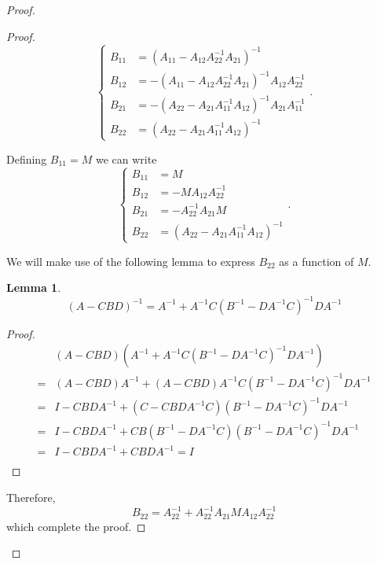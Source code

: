 \documentclass{article}
\newtheorem{lem}[thm]{Lemma}
\theoremstyle{definition}
\theoremstyle{remark}
\begin{document}
\begin{proof}
\begin{proof}
\begin{equation}
\left\{ \begin{array}{rl}
	B_{11}&=\left( A_{11}-A_{12}A_{22}^{-1}A_{21} \right)^{-1}\\ 
	B_{12}&=-\left( A_{11}-A_{12}A_{22}^{-1}A_{21} \right)^{-1}A_{12}A_{22}^{-1}\\
	B_{21}&=-\left( A_{22}-A_{21}A_{11}^{-1}A_{12} \right)^{-1}A_{21}A_{11}^{-1}\\
	B_{22}&=\left( A_{22}-A_{21}A_{11}^{-1}A_{12} \right)^{-1}
\end{array} \right. .
\end{equation}

Defining $B_{11}=M$ we can write
\begin{equation*}
\left\{ \begin{array}{rl}
	B_{11}&=M\\ 
	B_{12}&=-MA_{12}A_{22}^{-1}\\ 
	B_{21}&=-A_{22}^{-1}A_{21}M\\
	B_{22}&=\left( A_{22}-A_{21}A_{11}^{-1}A_{12} \right)^{-1}
\end{array} \right. .
\end{equation*}

We will make use of the following lemma to express $B_{22}$ as a function of $M$.
\begin{lem}
\begin{equation}
(A-CBD)^{-1}=A^{-1}+A^{-1}C(B^{-1}-DA^{-1}C)^{-1}DA^{-1}
\end{equation}
\end{lem}
\begin{proof}
\begin{align*}
&(A-CBD)(A^{-1}+A^{-1}C(B^{-1}-DA^{-1}C)^{-1}DA^{-1})\\
=&(A-CBD)A^{-1}+(A-CBD)A^{-1}C(B^{-1}-DA^{-1}C)^{-1}DA^{-1}\\
=&I-CBDA^{-1}+(C-CBDA^{-1}C)(B^{-1}-DA^{-1}C)^{-1}DA^{-1}\\
=&I-CBDA^{-1}+CB(B^{-1}-DA^{-1}C)(B^{-1}-DA^{-1}C)^{-1}DA^{-1}\\
=&I-CBDA^{-1}+CBDA^{-1}=I\\
\end{align*}
\end{proof}
Therefore,
\begin{equation*}
	B_{22}=A_{22}^{-1}+A_{22}^{-1}A_{21}MA_{12}A_{22}^{-1}
\end{equation*}
which complete the proof.


\end{proof}
\end{proof}
\end{document}
